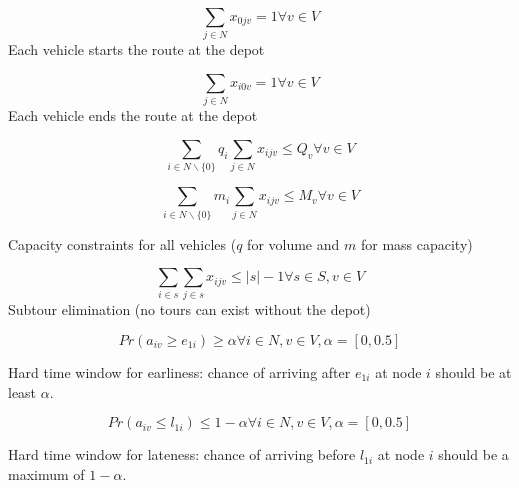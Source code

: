 \documentclass[a4paper,10pt,twoside]{report}
\begin{document}
\begin{equation}
\displaystyle\sum_{j \in N} x_{0jv} = 1 \forall v \in V
\end{equation}
Each vehicle starts the route at the depot


\begin{equation}
\displaystyle\sum_{j \in N} x_{i0v} = 1 \forall v \in V
\end{equation}
Each vehicle ends the route at the depot

\begin{equation}
\displaystyle\sum_{i \in N\backslash\{0\}} q_i \displaystyle\sum_{j \in N} x_{ijv} \leq Q_v \forall v \in V
\end{equation}

\begin{equation}
\displaystyle\sum_{i \in N\backslash\{0\}} m_i \displaystyle\sum_{j \in N} x_{ijv} \leq M_v \forall v \in V
\end{equation}

Capacity constraints for all vehicles ($q$ for volume and $m$ for mass capacity)

\begin{equation}
\displaystyle\sum_{i \in s} \displaystyle\sum_{j \in s} x_{ijv} \leq |s| - 1 \forall s \in S, v \in V
\end{equation}
Subtour elimination (no tours can exist without the depot)

\begin{equation}
Pr(a_{iv} \geq e_{1i}) \geq \alpha \forall i \in N, v \in V, \alpha = [0,0.5]
\end{equation}

Hard time window for earliness: chance of arriving after $e_{1i}$ at node $i$ should be at least $\alpha$.

\begin{equation}
Pr(a_{iv} \leq l_{1i}) \leq 1 - \alpha \forall i \in N, v \in V, \alpha = [0,0.5]
\end{equation}

Hard time window for lateness: chance of arriving before $l_{1i}$ at node $i$ should be a maximum of $1 - \alpha$.
\end{document}
